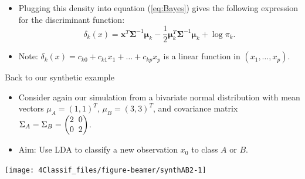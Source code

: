 \documentclass[
  10pt,
  ignorenonframetext,
]{beamer}
\begin{document}
\begin{frame}
\begin{itemize}
\item
  Plugging this density into equation (\ref{eq:Bayes}) gives the
  following expression for the discriminant function:
  \[\delta_k(x) = {\boldsymbol x}^T \boldsymbol{\Sigma}^{-1}\boldsymbol\mu_k - \frac{1}{2}\boldsymbol\mu_k^T \boldsymbol{\Sigma}^{-1}\boldsymbol\mu_k + \log \pi_k.\]
\item
  Note: \(\delta_k(x) = c_{k0} + c_{k1}x_1 + \ldots + c_{kp}x_p\) is a
  linear function in \((x_1,\ldots ,x_p)\).
\end{itemize}
\end{frame}

\begin{frame}
\begin{block}{Back to our synthetic example}
\protect\hypertarget{back-to-our-synthetic-example}{}
\vspace{2mm}

\begin{itemize}
\item
  Consider again our simulation from a bivariate normal distribution
  with mean vectors \(\mu_A = (1, 1)^T\), \(\mu_B = (3, 3)^T\), and
  covariance matrix
  \(\Sigma_A = \Sigma_B = \begin{pmatrix} 2\hspace{2mm} 0 \\ 0 \hspace{2mm} 2 \end{pmatrix}\).
\item
  Aim: Use LDA to classify a new observation \(x_0\) to class \(A\) or
  \(B\).
\end{itemize}

\vspace{4mm}

\begin{center}\texttt{[image: 4Classif\_files/figure-beamer/synthAB2-1]} \end{center}
\end{block}
\end{frame}
\end{document}
